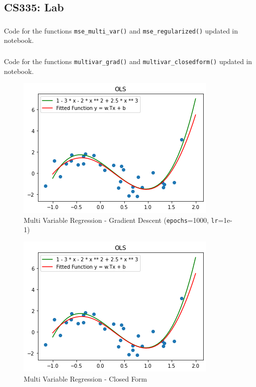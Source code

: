 \documentclass[12pt, fleqn]{article}
\begin{document}
\newpage
\subsection{CS335: Lab}
\subsubsection{}
Code for the functions \verb!mse_multi_var()! and \verb!mse_regularized()! updated in notebook.

\subsubsection{}
Code for the functions \verb!multivar_grad()! and \verb!multivar_closedform()! updated in notebook.
\begin{figure}[H]
  \centering
  \includegraphics[scale=0.7]{multivar_grad.png}
  \caption{Multi Variable Regression - Gradient Descent (\texttt{epochs}=1000, \texttt{lr}=1e-1)}
\end{figure}
\begin{figure}[H]
  \centering
  \includegraphics[scale=0.7]{multivar_closedform.png}
  \caption{Multi Variable Regression - Closed Form}
\end{figure}
\end{document}
